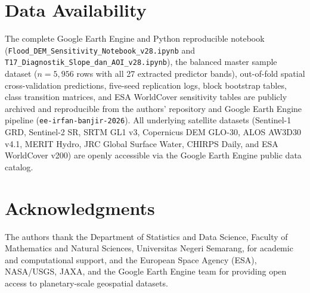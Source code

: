 \documentclass[11pt,twoside]{article}
\newcommand{\acknowledg}[1]{
\section*{Acknowledgments}
#1
}
\begin{document}
\section*{Data Availability}
The complete Google Earth Engine and Python reproducible notebook (\texttt{Flood\_DEM\_Sensitivity\_Notebook\_v28.ipynb} and \texttt{T17\_Diagnostik\_Slope\_dan\_AOI\_v28.ipynb}), the balanced master sample dataset ($n = 5{,}956$ rows with all 27 extracted predictor bands), out-of-fold spatial cross-validation predictions, five-seed replication logs, block bootstrap tables, class transition matrices, and ESA WorldCover sensitivity tables are publicly archived and reproducible from the authors' repository and Google Earth Engine pipeline (\texttt{ee-irfan-banjir-2026}). All underlying satellite datasets (Sentinel-1 GRD, Sentinel-2 SR, SRTM GL1 v3, Copernicus DEM GLO-30, ALOS AW3D30 v4.1, MERIT Hydro, JRC Global Surface Water, CHIRPS Daily, and ESA WorldCover v200) are openly accessible via the Google Earth Engine public data catalog.

\acknowledg{The authors thank the Department of Statistics and Data Science, Faculty of Mathematics and Natural Sciences, Universitas Negeri Semarang, for academic and computational support, and the European Space Agency (ESA), NASA/USGS, JAXA, and the Google Earth Engine team for providing open access to planetary-scale geospatial datasets.}

\FloatBarrier
\printbibliography
\end{document}
